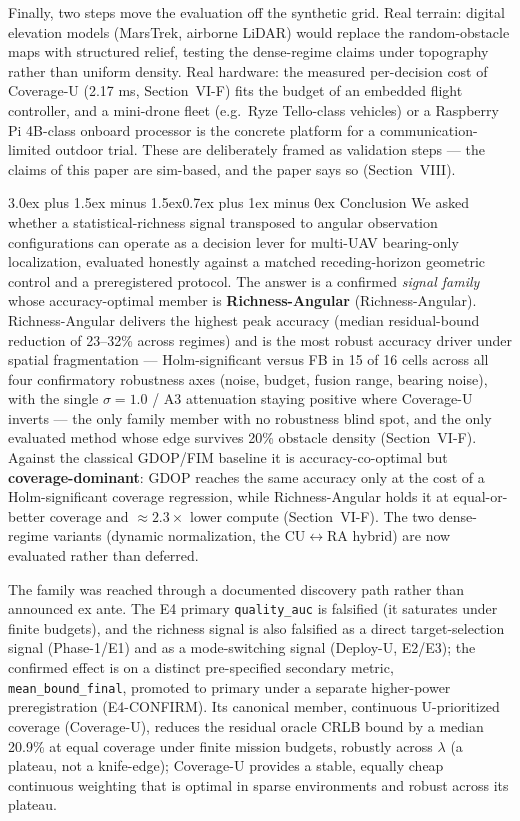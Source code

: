 \documentclass[journal]{IEEEtran}
\makeatletter
\newcommand{\CU}{Coverage-U}
\newcommand{\RA}{Richness-Angular}
\renewcommand{\section}{\@startsection{section}{1}{\z@}%
{3.0ex plus 1.5ex minus 1.5ex}{0.7ex plus 1ex minus 0ex}%
{\normalfont\large\bfseries\scshape\centering}}
\makeatother
\begin{document}
Finally, two steps move the evaluation off the synthetic grid. Real terrain:
digital elevation models (MarsTrek, airborne LiDAR) would replace the
random-obstacle maps with structured relief, testing the dense-regime claims
under topography rather than uniform density. Real hardware: the measured
per-decision cost of \CU{} (2.17 ms, Section~VI-F) fits the budget of an
embedded flight controller, and a mini-drone fleet (e.g.\ Ryze Tello-class
vehicles) or a Raspberry Pi 4B-class onboard processor is the concrete platform
for a communication-limited outdoor trial. These are deliberately framed as
validation steps --- the claims of this paper are sim-based, and the paper says
so (Section~VIII).

\section{Conclusion}
We asked whether a statistical-richness signal transposed to angular
observation configurations can operate as a decision lever for multi-UAV
bearing-only localization, evaluated honestly against a matched receding-horizon
geometric control and a preregistered protocol. The answer is a confirmed
\emph{signal family} whose accuracy-optimal member is \textbf{Richness-Angular}
(\RA{}). \RA{} delivers the highest peak accuracy (median residual-bound
reduction of 23--32\% across regimes) and is the most robust accuracy driver
under spatial fragmentation --- Holm-significant versus FB in 15 of 16 cells
across all four confirmatory robustness axes (noise, budget, fusion range,
bearing noise), with the single $\sigma = 1.0$ / A3 attenuation staying positive
where \CU{} inverts --- the only family member with no robustness blind spot,
and the only evaluated method whose edge survives 20\% obstacle density (Section~VI-F).
Against the classical GDOP/FIM baseline it is accuracy-co-optimal but
\textbf{coverage-dominant}: GDOP reaches the same accuracy only at the cost of a
Holm-significant coverage regression, while \RA{} holds it at equal-or-better
coverage and $\approx 2.3\times$ lower compute (Section~VI-F). The two
dense-regime variants (dynamic normalization, the CU$\leftrightarrow$RA hybrid)
are now evaluated rather than deferred.

The family was reached through a documented discovery path rather than
announced ex ante. The E4 primary \texttt{quality\_auc} is falsified (it
saturates under finite budgets), and the richness signal is also falsified as a
direct target-selection signal (Phase-1/E1) and as a mode-switching signal
(Deploy-U, E2/E3); the confirmed effect is on a distinct pre-specified
secondary metric, \texttt{mean\_bound\_final}, promoted to primary under a
separate higher-power preregistration (E4-CONFIRM). Its canonical member,
continuous U-prioritized coverage (\CU), reduces the residual oracle CRLB bound
by a median 20.9\% at equal coverage under finite mission budgets, robustly
across $\lambda$ (a plateau, not a knife-edge); \CU{} provides a stable, equally
cheap continuous weighting that is optimal in sparse environments and robust
across its plateau.
\end{document}
